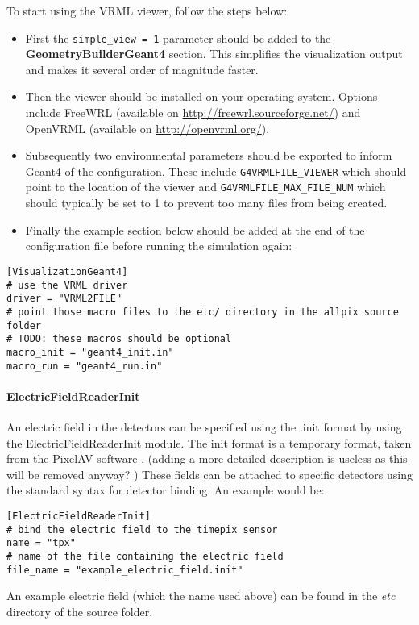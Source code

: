 To start using the VRML viewer, follow the steps below:
\begin{itemize}
\item First the \texttt{simple\_view = 1} parameter should be added to the \textbf{GeometryBuilderGeant4} section. This simplifies the visualization output and makes it several order of magnitude faster. 
\item Then the viewer should be installed on your operating system. Options include FreeWRL (available on \url{http://freewrl.sourceforge.net/}) and OpenVRML (available on \url{http://openvrml.org/}).
\item Subsequently two environmental parameters should be exported to inform Geant4 of the configuration. These include \texttt{G4VRMLFILE\_VIEWER} which should point to the location of the viewer and \texttt{G4VRMLFILE\_MAX\_FILE\_NUM} which should typically be set to 1 to prevent too many files from being created.
\item Finally the example section below should be added at the end of the configuration file before running the simulation again:
\end{itemize}

\begin{verbatim}
[VisualizationGeant4]
# use the VRML driver
driver = "VRML2FILE" 
# point those macro files to the etc/ directory in the allpix source folder
# TODO: these macros should be optional
macro_init = "geant4_init.in"
macro_run = "geant4_run.in"
\end{verbatim}

\paragraph{ElectricFieldReaderInit}
An electric field in the detectors can be specified using the .init format by using the ElectricFieldReaderInit module. The init format is a temporary format, taken from the PixelAV software \needcite. (\todo adding a more detailed description is useless as this will be removed anyway? \todo) These fields can be attached to specific detectors using the standard syntax for detector binding. An example would be:
\begin{verbatim}
[ElectricFieldReaderInit]
# bind the electric field to the timepix sensor
name = "tpx"
# name of the file containing the electric field
file_name = "example_electric_field.init"
\end{verbatim}
An example electric field (which the name used above) can be found in the \textit{etc} directory of the \apsq source folder.

